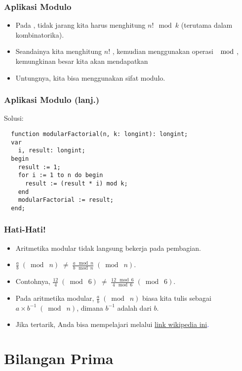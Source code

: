 \begin{frame}
\frametitle{Aplikasi Modulo}
\begin{itemize}
  \item Pada , tidak jarang kita harus menghitung $n! \mod k$ (terutama dalam kombinatorika). 
  \item Seandainya kita menghitung $n!$ , kemudian menggunakan operasi $\mod$, kemungkinan besar kita akan mendapatkan 
  \item Untungnya, kita bisa menggunakan sifat modulo.
\end{itemize}
\end{frame}

\begin{frame}[fragile]
\frametitle{Aplikasi Modulo (lanj.)}
Solusi: 
\begin{lstlisting}
  function modularFactorial(n, k: longint): longint;
  var
    i, result: longint;
  begin
    result := 1;
    for i := 1 to n do begin
      result := (result * i) mod k;
    end
    modularFactorial := result;
  end;  
\end{lstlisting}
\end{frame}

\begin{frame}
\frametitle{Hati-Hati!}
\begin{itemize}
  \item Aritmetika modular tidak langsung bekerja pada pembagian.
  \item $\frac{a}{b} \; (\bmod\; n) \; \neq \; \frac{a \mod n}{b \mod n} \; (\bmod\; n)$.
  \item Contohnya, $\frac{12}{4} \; (\bmod\; 6) \; \neq \; \frac{12 \mod 6}{4 \mod 6} \; (\bmod\; 6)$.
  \item Pada aritmetika modular, $\frac{a}{b} \; (\bmod\; n)$ biasa kita tulis sebagai $a \times b^{-1}\;(\bmod\; n)$, dimana $b^{-1}$ adalah 
       dari $b$.
  \item Jika tertarik, Anda bisa mempelajari  melalui \textcolor{blue}{\href{https://en.wikipedia.org/wiki/  Modular_multiplicative_inverse}{link wikipedia ini}.} 
\end{itemize}
\end{frame}

\section{Bilangan Prima}
\frame{\sectionpage}

